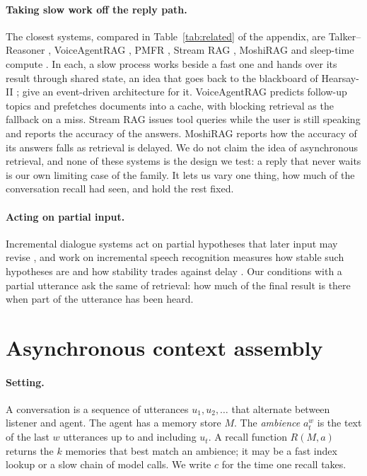 \documentclass[10pt]{article}
\begin{document}
\paragraph{Taking slow work off the reply path.} The closest systems, compared in Table~\ref{tab:related} of the appendix, are Talker--Reasoner \citep{christakopoulou2024talker}, VoiceAgentRAG \citep{qiu2026voiceagentrag}, PMFR \citep{gan2025pmfr}, Stream RAG \citep{arora2025streamrag}, MoshiRAG \citep{chien2026moshirag,defossez2024moshi} and sleep-time compute \citep{lin2025sleeptime}. In each, a slow process works beside a fast one and hands over its result through shared state, an idea that goes back to the blackboard of Hearsay-II \citep{erman1980hearsay}; \citet{ginart2024async} give an event-driven architecture for it. VoiceAgentRAG predicts follow-up topics and prefetches documents into a cache, with blocking retrieval as the fallback on a miss. Stream RAG issues tool queries while the user is still speaking and reports the accuracy of the answers. MoshiRAG reports how the accuracy of its answers falls as retrieval is delayed. We do not claim the idea of asynchronous retrieval, and none of these systems is the design we test: a reply that never waits is our own limiting case of the family. It lets us vary one thing, how much of the conversation recall had seen, and hold the rest fixed.

\paragraph{Acting on partial input.} Incremental dialogue systems act on partial hypotheses that later input may revise \citep{schlangen2009incremental}, and work on incremental speech recognition measures how stable such hypotheses are and how stability trades against delay \citep{baumann2009incremental,selfridge2011stability}. Our conditions with a partial utterance ask the same of retrieval: how much of the final result is there when part of the utterance has been heard.

\section{Asynchronous context assembly}
\label{sec:design}

\paragraph{Setting.} A conversation is a sequence of utterances $u_1, u_2, \dots$ that alternate between listener and agent. The agent has a memory store $M$. The \emph{ambience} $a^{w}_{t}$ is the text of the last $w$ utterances up to and including $u_t$. A recall function $R(M, a)$ returns the $k$ memories that best match an ambience; it may be a fast index lookup or a slow chain of model calls. We write $c$ for the time one recall takes.
\end{document}
